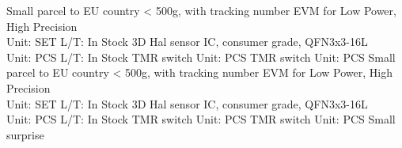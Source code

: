 {                            { 
                            Small parcel to EU country < 500g, with tracking number 
                            }
                            { 
                            EVM for Low Power, High Precision \\ 
                            Unit: SET \quad L/T: In Stock 
                            }
                            { 
                            3D Hal sensor IC, consumer grade, QFN3x3-16L \\ 
                            Unit: PCS \quad L/T: In Stock 
                            }
                            { 
                            TMR switch \quad  
                            Unit: PCS 
                            }
                            { 
                            TMR switch \quad 
                            Unit: PCS 
                            }
                            { 
                            Small parcel to EU country < 500g, with tracking number 
                            }
                            { 
                            EVM for Low Power, High Precision \\ 
                            Unit: SET \quad L/T: In Stock 
                            }
                            { 
                            3D Hal sensor IC, consumer grade, QFN3x3-16L \\ 
                            Unit: PCS \quad L/T: In Stock 
                            }
                            { 
                            TMR switch \quad 
                            Unit: PCS 
                            }
                            { 
                            TMR switch \quad 
                            Unit: PCS 
                            }
                            { 
                            Small surprise 
                            }
}


\maininvoice


